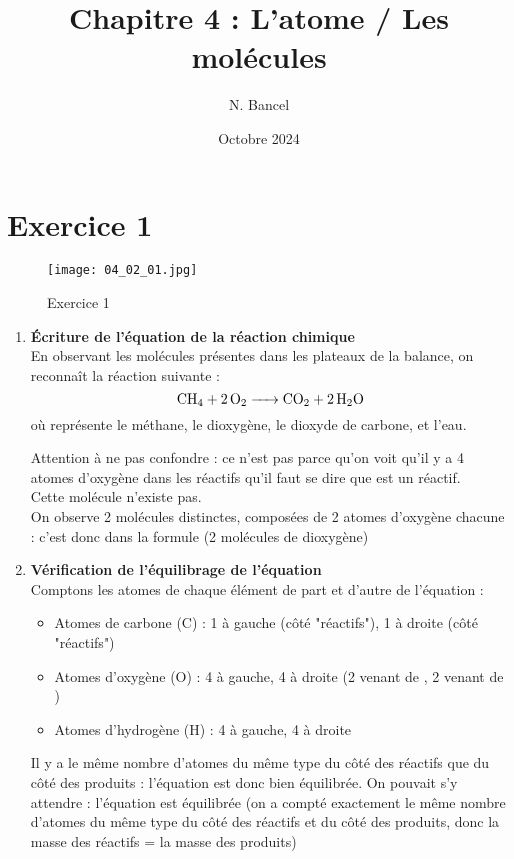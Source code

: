 \documentclass[a4paper,12pt]{article}
\begin{document}
\title{Chapitre 4 : L'atome / Les molécules}
\author{N. Bancel}
\date{Octobre 2024}

\maketitle

\section{Exercice 1}

\begin{figure}[H]
  \centering
  \texttt{[image: 04\_02\_01.jpg]}
  \caption{Exercice 1}
\end{figure}

\begin{enumerate}[label=\textbf{1.\alph*}]
    \item \textbf{Écriture de l'équation de la réaction chimique}\\
    En observant les molécules présentes dans les plateaux de la balance, on reconnaît la réaction suivante :
    \[
    \ce{CH4 + 2 O2 -> CO2 + 2 H2O}
    \]
    où  représente le méthane,  le dioxygène,  le dioxyde de carbone, et  l'eau.

    \begin{tcolorbox}[colback=blue!10!white, colframe=blue!75!black, title=Attention]
      Attention à ne pas confondre : ce n'est pas parce qu'on voit qu'il y a 4 atomes d'oxygène dans les réactifs qu'il faut se dire que  est un réactif. \\
      Cette molécule n'existe pas. \\
      On observe 2 molécules distinctes, composées de 2 atomes d'oxygène chacune : c'est donc  dans la formule (2 molécules de dioxygène)
    \end{tcolorbox}

    \item \textbf{Vérification de l'équilibrage de l'équation}\\
    Comptons les atomes de chaque élément de part et d'autre de l'équation :
    \begin{itemize}[noitemsep]
        \item Atomes de carbone (C) : 1 à gauche (côté "réactifs"), 1 à droite (côté "réactifs")
        \item Atomes d'oxygène (O) : 4 à gauche, 4 à droite (2 venant de , 2 venant de )
        \item Atomes d'hydrogène (H) : 4 à gauche, 4 à droite
    \end{itemize}
    Il y a le même nombre d'atomes du même type du côté des réactifs que du côté des produits : l'équation est donc bien équilibrée. On pouvait s'y attendre : l'équation est équilibrée (on a compté exactement le même nombre d'atomes du même type du côté des réactifs et du côté des produits, donc la masse des réactifs = la masse des produits)

\end{enumerate}
\end{document}
